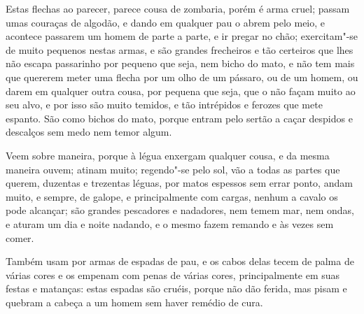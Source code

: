  Estas flechas ao parecer, parece cousa de zombaria, porém é arma cruel;
passam umas couraças de algodão, e dando em qualquer pau o abrem pelo
meio, e acontece passarem um homem de parte a parte, e ir pregar no
chão; exercitam"-se de muito pequenos nestas armas, e são grandes
frecheiros e tão certeiros que lhes não escapa passarinho por pequeno
que seja, nem bicho do mato, e não tem mais que quererem meter uma
flecha por um olho de um pássaro, ou de um homem, ou darem em qualquer
outra cousa, por pequena que seja, que o não façam muito ao seu alvo, e
por isso são muito temidos, e tão intrépidos e ferozes que mete
espanto. São como bichos do mato, porque entram pelo sertão a caçar
despidos e descalços sem medo nem temor algum.

 Veem sobre maneira, porque à légua enxergam qualquer cousa, e da mesma
maneira ouvem; atinam muito; regendo"-se pelo sol, vão a todas as partes
que querem, duzentas e trezentas léguas, por matos espessos sem errar
ponto, andam muito, e sempre, de galope, e principalmente com cargas,
nenhum a cavalo os pode alcançar; são grandes pescadores e nadadores,
nem temem mar, nem ondas, e aturam um dia e noite nadando, e o mesmo
fazem remando e às vezes sem comer.

 Também usam por armas de espadas de pau, e os cabos delas tecem de
palma de várias cores e os empenam com penas de várias cores,
principalmente em suas festas e matanças: estas espadas são cruéis,
porque não dão ferida, mas pisam e quebram a cabeça a um homem sem
haver remédio de cura.

